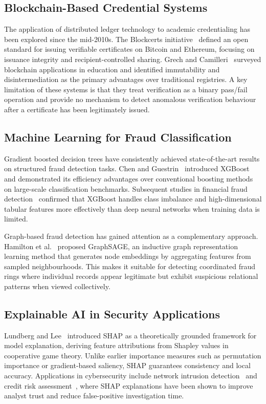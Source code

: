 \documentclass[conference]{IEEEtran}
\begin{document}
\subsection{Blockchain-Based Credential Systems}

The application of distributed ledger technology to academic
credentialing has been explored since the mid-2010s. The Blockcerts
initiative~\cite{ref1} defined an open standard for issuing
verifiable certificates on Bitcoin and Ethereum, focusing on
issuance integrity and recipient-controlled sharing. Grech and
Camilleri~\cite{ref2} surveyed blockchain applications in education
and identified immutability and disintermediation as the primary
advantages over traditional registries. A key limitation of these
systems is that they treat verification as a binary pass/fail
operation and provide no mechanism to detect anomalous verification
behaviour after a certificate has been legitimately issued.

\subsection{Machine Learning for Fraud Classification}

Gradient boosted decision trees have consistently achieved
state-of-the-art results on structured fraud detection tasks.
Chen and Guestrin~\cite{ref3} introduced XGBoost and demonstrated
its efficiency advantages over conventional boosting methods on
large-scale classification benchmarks. Subsequent studies in
financial fraud detection~\cite{ref4} confirmed that XGBoost
handles class imbalance and high-dimensional tabular features more
effectively than deep neural networks when training data is limited.

Graph-based fraud detection has gained attention as a complementary
approach. Hamilton et al.~\cite{ref5} proposed GraphSAGE, an
inductive graph representation learning method that generates node
embeddings by aggregating features from sampled neighbourhoods.
This makes it suitable for detecting coordinated fraud rings where
individual records appear legitimate but exhibit suspicious
relational patterns when viewed collectively.

\subsection{Explainable AI in Security Applications}

Lundberg and Lee~\cite{ref6} introduced SHAP as a theoretically
grounded framework for model explanation, deriving feature
attributions from Shapley values in cooperative game theory. Unlike
earlier importance measures such as permutation importance or
gradient-based saliency, SHAP guarantees consistency and local
accuracy. Applications in cybersecurity include network intrusion
detection~\cite{ref7} and credit risk assessment~\cite{ref8}, where
SHAP explanations have been shown to improve analyst trust and
reduce false-positive investigation time.
\end{document}
